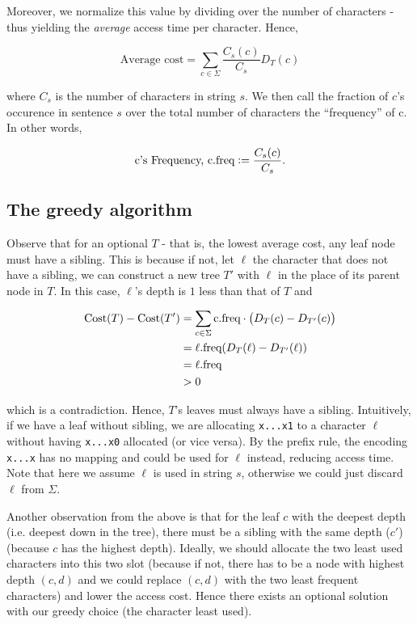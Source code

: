 Moreover, we normalize this value by dividing over the number of characters - thus yielding the \textit{average} access time per character. Hence, 

\[
    \text{Average cost} = \sum_{c \in \Sigma} \frac{C_s(c)}{C_s} D_T(c)  
\]

where $C_s$ is the number of characters in string $s$. We then call the fraction of $c$'s occurence in sentence $s$ over the total number of characters the ``frequency'' of c. 
In other words, 

\[
    \text{c's Frequency, c.freq} := \frac{C_s(c)}{C_s}.
\]

\subsection{The greedy algorithm}

Observe that for an optional $T$ - that is, the lowest average cost, any leaf node must have a sibling. This is because if not, let $\ell$ the character that does not have a sibling, we can construct a new tree $T'$ with $\ell$ in the place of its parent node in $T$. 
In this case, $\ell$'s depth is $1$ less than that of $T$ and 

\[
\begin{split}
  \text{Cost}(T)-\text{Cost}(T') &= \sum_{c \in \Sigma} \text{c.freq}\cdot\del{ D_T(c)-D_{T'}(c)} \\
  &=\ell.\text{freq}(D_T(\ell)-D_{T'}(\ell)) \\
  &=\ell.\text{freq} \\
  &>0
\end{split}
\]

which is a contradiction. 
Hence, $T$'s leaves must always have a sibling.
Intuitively, if we have a leaf without sibling, we are allocating \texttt{x...x1} to a character $\ell$ without having \texttt{x...x0} allocated (or vice versa). 
By the prefix rule, the encoding \texttt{x...x} has no mapping and could be used for $\ell$ instead, reducing access time. 
Note that here we assume $\ell$ is used in string $s$, otherwise we could just discard $\ell$ from $\Sigma$. 

Another observation from the above is that for the leaf $c$ with the deepest depth (i.e. deepest down in the tree), there must be a sibling with the same depth ($c'$) (because $c$ has the highest depth). 
Ideally, we should allocate the two least used characters into this two slot (because if not, there has to be a node with highest depth $(c, d)$ and we could replace $(c, d)$ with the two least frequent characters) and lower the access cost. 
Hence there exists an optional solution with our greedy choice (the character least used). 

